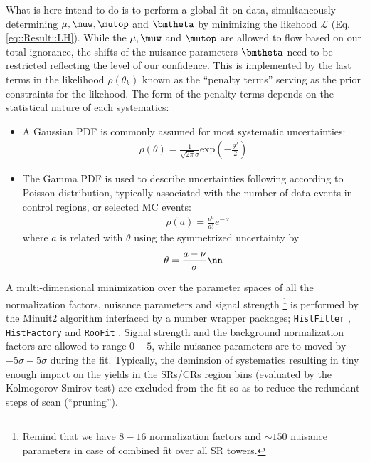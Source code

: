 What is here intend to do is to perform a global fit on data, simultaneously determining $\mu, \muw, \mutop$ and $\bmtheta$ by minimizing the likehood $\mathcal{L}$ (Eq. \ref{eq::Result::LH}). While the $\mu, \muw$ and $\mutop$ are allowed to flow based on our total ignorance, the shifts of the nuisance parameters $\bmtheta$ need to be restricted reflecting the level of our confidence. This is implemented by the last terms in the likelihood $\rho(\theta_k)$ known as the ``penalty terms'' serving as the prior constraints for the likehood. The form of the penalty terms depends on the statistical nature of each systematics:
\begin{itemize}
\item A Gaussian PDF is commonly assumed for most systematic uncertainties:
\begin{align}
\rho (\theta) = \frac{1}{\sqrt{2\pi}\sigma} \mathrm{exp} \left( - \frac{\theta^2}{2} \right)
\end{align}


\item The Gamma PDF is used to describe uncertainties following according to Poisson distribution, typically associated with the number of data events in control regions, or selected MC events:
\begin{align}
& \rho (a) = \frac{\nu^a}{a!} e^{-\nu} 
\end{align}
where $a$ is related with $\theta$ using the symmetrized uncertainty by 
\begin{align}
& \theta = \frac{a-\nu}{\sigma} \nn \\
\end{align}
\end{itemize}

A multi-dimensional minimization over the parameter spaces of all the normalization factors, nuisance parameters and signal strength 
\footnote{Remind that we have $8-16$ normalization factors and $\sim 150$ nuisance parameters in case of combined fit over all SR towers.}
is performed by the Minuit2 algorithm \cite{Minuite2} interfaced by a number wrapper packages; \texttt{HistFitter} \cite{HistFitter}, \texttt{HistFactory} \cite{HistFactory} and \texttt{RooFit} \cite{RooFit}.
Signal strength and the background normalization factors are allowed to range $0-5$, while nuisance parameters are to moved by $-5\sigma - 5\sigma$ during the fit. Typically, the deminsion of systematics resulting in tiny enough impact on the yields in the SRs/CRs region bins (evaluated by the Kolmogorov-Smirov test) are excluded from the fit so as to reduce the redundant steps of scan (``pruning'').


